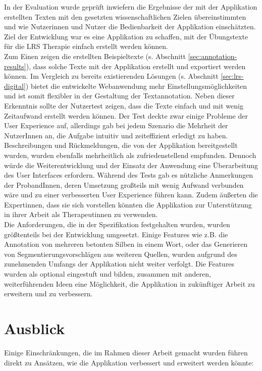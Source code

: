 In der Evaluation wurde geprüft inwiefern die Ergebnisse der mit der Applikation erstellten Texten mit den gesetzten wissenschaftlichen Zielen übereinstimmten und wie Nutzerinnen und Nutzer die Bedienbarkeit der Applikation einschätzten. Ziel der Entwicklung war es eine Applikation zu schaffen, mit der Übungstexte für die LRS Therapie einfach erstellt werden können.\\
Zum Einen zeigen die erstellten Beispieltexte (s. Abschnitt \ref{sec:annotation-results}), dass solche Texte mit der Applikation erstellt und exportiert werden können. Im Vergleich zu bereits existierenden Lösungen (s. Abschnitt \ref{sec:lrs-digital}) bietet die entwickelte Webanwendung mehr Einstellungsmöglichkeiten und ist somit flexibler in der Gestaltung der Textannotation. Neben dieser Erkenntnis sollte der Nutzertest zeigen, dass die Texte einfach und mit wenig Zeitaufwand erstellt werden können. Der Test deckte zwar einige Probleme der User Experience auf, allerdings gab bei jedem Szenario die Mehrheit der NutzerInnen an, die Aufgabe intuitiv und zeiteffizient erledigt zu haben. Beschreibungen und Rückmeldungen, die von der Applikation bereitgestellt wurden, wurden ebenfalls mehrheitlich als zufriedenstellend empfunden. Dennoch würde die Weiterentwicklung und der Einsatz der Anwendung eine Überarbeitung des User Interfaces erfordern. Während des Tests gab es nützliche Anmerkungen der ProbandInnen, deren Umsetzung großteils mit wenig Aufwand verbunden wäre und zu einer verbesserten User Experience führen kann. Zudem äußerten die Expertinnen, dass sie sich vorstellen könnten die Applikation zur Unterstützung in ihrer Arbeit als Therapeutinnen zu verwenden.\\
Die Anforderungen, die in der Spezifikation festgehalten wurden, wurden größtenteils bei der Entwicklung umgesetzt. Einige Features wie z.B. die Annotation von mehreren betonten Silben in einem Wort, oder das Generieren von Segmentierungsvorschlägen aus weiteren Quellen, wurden aufgrund des zunehmenden Umfangs der Applikation nicht weiter verfolgt. Die Features wurden als optional eingestuft und bilden, zusammen mit anderen, weiterführenden Ideen eine Möglichkeit, die Applikation in zukünftiger Arbeit zu erweitern und zu verbessern.

\section{Ausblick}

Einige Einschränkungen, die im Rahmen dieser Arbeit gemacht wurden führen direkt zu Ansätzen, wie die Applikation verbessert und erweitert werden könnte:

